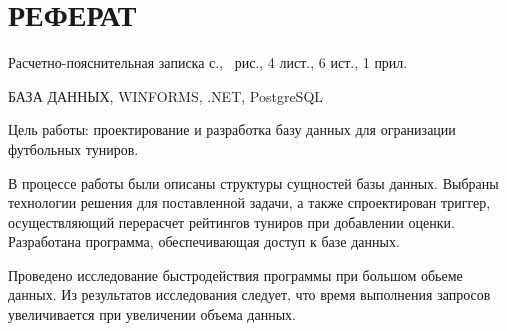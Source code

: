 \section*{\centering РЕФЕРАТ}
\setcounter{page}{2}

Расчетно-пояснительная записка \pageref{LastPage} с., \totalfigures\ рис., 4 лист., 6 ист., 1 прил.

БАЗА ДАННЫХ, WINFORMS, .NET, PostgreSQL

Цель работы: проектирование и разработка базу данных для огранизации футбольных туниров.

В процессе работы были описаны структуры сущностей базы данных. 
Выбраны технологии решения для поставленной задачи, а также спроектирован триггер, осуществляющий перерасчет рейтингов туниров при добавлении оценки.
Разработана программа, обеспечивающая доступ к базе данных.

Проведено исследование быстродействия программы при большом обьеме данных.  
Из результатов исследования следует, что время выполнения запросов увеличивается при увеличении объема данных.